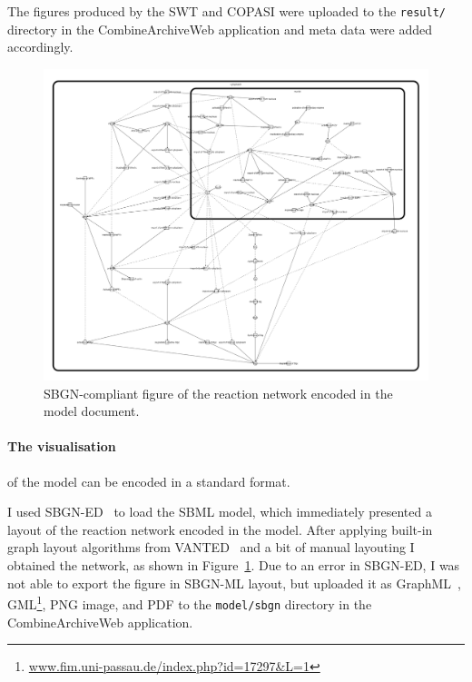 The figures produced by the SWT and COPASI were uploaded to the \texttt{result/} directory in the CombineArchiveWeb application and meta data were added accordingly.



\begin{figure}
\begin{center}
\includegraphics[width=.7\textwidth]{img/Calzone2007.png}
\end{center}
\caption{SBGN-compliant figure of the reaction network encoded in the model document.}
\label{fig:sbgngraph}
\end{figure}
\paragraph{The visualisation} of the model can be encoded in a standard format.

I used SBGN-ED~\cite{sbgned} to load the SBML model, which immediately presented a layout of the reaction network encoded in the model.
After applying built-in graph layout algorithms from VANTED~\cite{vanted} and a bit of manual layouting I obtained the network, as shown in Figure~\ref{fig:sbgngraph}.
Due to an error in SBGN-ED, I was not able to export the figure in SBGN-ML layout, but uploaded it as GraphML~\cite{graphml}, GML\footnote{\href{http://www.fim.uni-passau.de/index.php?id=17297&L=1}{www.fim.uni-passau.de/index.php?id=17297\&L=1}}, PNG image, and PDF to the \texttt{model/sbgn} directory in the CombineArchiveWeb application.


























